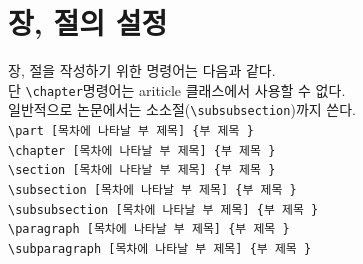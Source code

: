 \documentclass[12pt, a4paper, oneside]{book}
\let\stdsection\section
\renewcommand\section{\newpage\stdsection}
\begin{document}
		\minitoc				%
		\doublespace




					
	\newpage
	\section{장, 절의 설정}
					

		장, 절을 작성하기 위한 명령어는 다음과 같다.\\
		단 \verb|\chapter|명령어는 ariticle 클래스에서 사용할 수 없다.\\
		일반적으로 논문에서는 소소절(\verb|\subsubsection|)까지 쓴다.\\

		\verb|\part [목차에 나타날 부 제목] {부 제목 }|\\
		\verb|\chapter [목차에 나타날 부 제목] {부 제목 }|\\
		\verb|\section [목차에 나타날 부 제목] {부 제목 }|\\
		\verb|\subsection [목차에 나타날 부 제목] {부 제목 }|\\
		\verb|\subsubsection [목차에 나타날 부 제목] {부 제목 }|\\
		\verb|\paragraph [목차에 나타날 부 제목] {부 제목 }|\\
		\verb|\subparagraph [목차에 나타날 부 제목] {부 제목 }|\\
\end{document}

